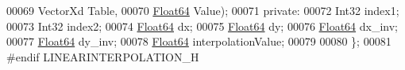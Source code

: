 \begin{DoxyCode}
00069                                 VectorXd Table,
00070                                 \hyperlink{group___tools_ga3f1431cb9f76da10f59246d1d743dc2c}{Float64} Value);
00071 \textcolor{keyword}{private}:
00072     Int32       index1;
00073     Int32       index2;
00074     \hyperlink{group___tools_ga3f1431cb9f76da10f59246d1d743dc2c}{Float64}     dx;
00075     \hyperlink{group___tools_ga3f1431cb9f76da10f59246d1d743dc2c}{Float64}      dy;
00076     \hyperlink{group___tools_ga3f1431cb9f76da10f59246d1d743dc2c}{Float64}     dx\_inv;
00077     \hyperlink{group___tools_ga3f1431cb9f76da10f59246d1d743dc2c}{Float64}      dy\_inv;
00078     \hyperlink{group___tools_ga3f1431cb9f76da10f59246d1d743dc2c}{Float64}      interpolationValue;
00079 
00080 \};
00081 \textcolor{preprocessor}{#endif LINEARINTERPOLATION\_H}
\end{DoxyCode}
